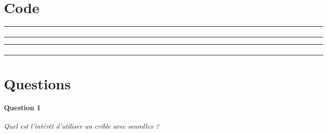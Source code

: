 \documentclass{article}
\title{
\vspace{2in}
\textmd{\textbf{\hmwkClass}}\\
\normalsize\vspace{0.1in}\small{\hmwkDueDate}\\
\vspace{0.1in}\large{\textit{\hmwkClassInstructor\ \hmwkClassTime}}
\vspace{3in}
}
\author{\hmwkAuthorName}
\date{} %
\begin{document}
\maketitle
\newpage

\section{Code}



\begin{tabular}{ccccccccccccccccccccccccccccccccccccccccccccccc}
   	& & & & & & & & & & & & & & & & & & & & & & & & & & & & & & & & & & & & & & & & & & & \\
	& & & & & & & & & & & & & & & & & & & & & & & & & & & & & & & & & & & & & & & & & & & \\
  	\hline
	& & & & & & & & & & & & & & & & & & & & & & & & & & & & & & & & & & & & & & & & & & & \\
	& & & & & & & & & & & & & & & & & & & & & & & & & & & & & & & & & & & & & & & & & & & \\
\end{tabular}



\newpage



\begin{tabular}{ccccccccccccccccccccccccccccccccccccccccccccccc}
   	& & & & & & & & & & & & & & & & & & & & & & & & & & & & & & & & & & & & & & & & & & & \\
	& & & & & & & & & & & & & & & & & & & & & & & & & & & & & & & & & & & & & & & & & & & \\
  	\hline
	& & & & & & & & & & & & & & & & & & & & & & & & & & & & & & & & & & & & & & & & & & & \\
	& & & & & & & & & & & & & & & & & & & & & & & & & & & & & & & & & & & & & & & & & & & \\
\end{tabular}




\newpage
\section{Questions}
\paragraph{Question 1}
\emph{Quel est l'intérêt d'utiliser un crible avec ocamllex ?}
\end{document}
